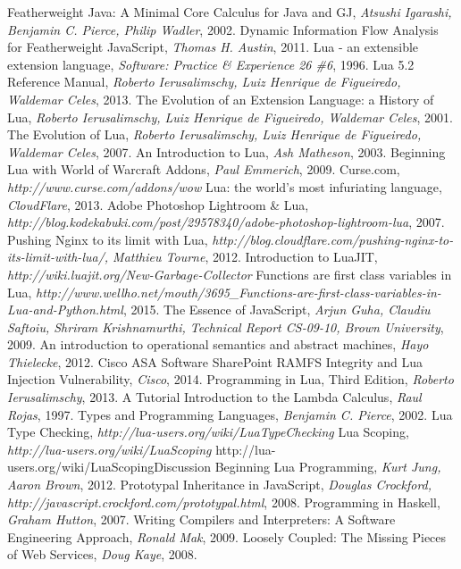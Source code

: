 \begin{thebibliography}{10}

 Featherweight Java: A Minimal Core Calculus for Java and GJ, {\it Atsushi Igarashi, Benjamin C. Pierce, Philip Wadler}, 2002.
 Dynamic Information Flow Analysis for Featherweight JavaScript, {\it Thomas H. Austin}, 2011.
 Lua - an extensible extension language, {\it  Software: Practice \& Experience 26 \#6}, 1996.
 Lua 5.2 Reference Manual, {\it Roberto Ierusalimschy, Luiz Henrique de Figueiredo, Waldemar Celes}, 2013.
 The Evolution of an Extension Language: a History of Lua, {\it  Roberto Ierusalimschy, Luiz Henrique de Figueiredo, Waldemar Celes}, 2001.
 The Evolution of Lua, {\it Roberto Ierusalimschy, Luiz Henrique de Figueiredo, Waldemar Celes}, 2007.
 An Introduction to Lua, {\it  Ash Matheson}, 2003.
 Beginning Lua with World of Warcraft Addons, {\it Paul Emmerich}, 2009.
 Curse.com, {\it http://www.curse.com/addons/wow}
 Lua: the world's most infuriating language, {\it CloudFlare}, 2013.
 Adobe Photoshop Lightroom \& Lua, {\it http://blog.kodekabuki.com/post/29578340/adobe-photoshop-lightroom-lua}, 2007.
 Pushing Nginx to its limit with Lua,  {\it http://blog.cloudflare.com/pushing-nginx-to-its-limit-with-lua/, Matthieu Tourne}, 2012.
 Introduction to LuaJIT, {\it http://wiki.luajit.org/New-Garbage-Collector}
 Functions are first class variables in Lua, {\it http://www.wellho.net/mouth/3695\_Functions-are-first-class-variables-in-Lua-and-Python.html}, 2015.
 The Essence of JavaScript, {\it Arjun Guha, Claudiu Saftoiu, Shriram Krishnamurthi, Technical Report CS-09-10, Brown University}, 2009.
 An introduction to operational semantics and abstract machines, {\it Hayo Thielecke}, 2012.
 Cisco ASA Software SharePoint RAMFS Integrity and Lua Injection Vulnerability, {\it Cisco}, 2014.
 Programming in Lua, Third Edition, {\it  Roberto Ierusalimschy}, 2013.
 A Tutorial Introduction to the Lambda Calculus, {\it Raul Rojas}, 1997.
 Types and Programming Languages, {\it Benjamin C. Pierce}, 2002.
 Lua Type Checking, {\it http://lua-users.org/wiki/LuaTypeChecking}
 Lua Scoping, {\it http://lua-users.org/wiki/LuaScoping}
 http://lua-users.org/wiki/LuaScopingDiscussion
 Beginning Lua Programming, {\it Kurt Jung, Aaron Brown}, 2012.
 Prototypal Inheritance in JavaScript, {\it Douglas Crockford, http://javascript.crockford.com/prototypal.html}, 2008.
 Programming in Haskell, {\it Graham Hutton}, 2007.
 Writing Compilers and Interpreters: A Software Engineering Approach, {\it Ronald Mak}, 2009.
 Loosely Coupled: The Missing Pieces of Web Services, {\it Doug Kaye}, 2008.
\\

\end{thebibliography}
